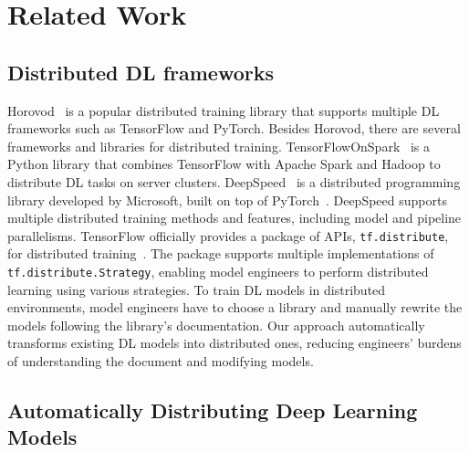 \section{Related Work}\label{sec:related}

\subsection{Distributed DL frameworks}

Horovod~\cite{sergeev2018horovod} is a popular distributed training library that
supports multiple DL frameworks such as TensorFlow and PyTorch.
Besides Horovod, there are several frameworks and libraries for distributed
training.
TensorFlowOnSpark~\cite{tfonspark} is a Python library that
combines TensorFlow with Apache Spark and Hadoop to distribute
DL tasks on server clusters. 
DeepSpeed~\cite{deepspeed} is a distributed programming library developed by
Microsoft, built on top of PyTorch~\cite{pytorch2019}.  
DeepSpeed supports multiple distributed training methods and features,
including model and pipeline parallelisms. 
TensorFlow officially provides a package of APIs, {\tt tf.distribute}, for
distributed training~\cite{tfdistributed}.
The package supports multiple implementations of {\tt tf.distribute.Strategy},
enabling model engineers to perform distributed learning using various
strategies.
To train DL models in distributed environments, model engineers have to choose
a library and manually rewrite the models following the library's documentation.
Our approach automatically transforms existing DL models into distributed ones,
reducing engineers' burdens of understanding the document and modifying models.


\subsection{Automatically Distributing Deep Learning Models}

